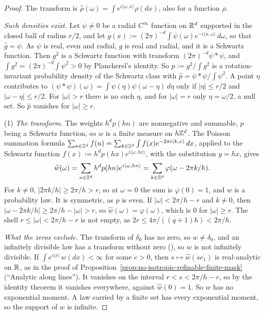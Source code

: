 \begin{proof}
The transform is $\widehat\rho(\omega) = \int e^{i\langle\omega, x\rangle}\rho(dx)$, also for a
function $\rho$.

\emph{Such densities exist.} Let $\psi \ne 0$ be a radial $C^\infty$ function on $\mathbb{R}^d$ supported
in the closed ball of radius $r/2$, and let
$g(x) := (2\pi)^{-d}\int\psi(\omega)e^{-i\langle x, \omega\rangle}\,d\omega$, so that
$\widehat g = \psi$. As $\psi$ is real, even and radial, $g$ is real and radial, and it is a
Schwartz function. Then $g^2$ is a Schwartz function with transform $(2\pi)^{-d}\psi * \psi$, and
$\int g^2 = (2\pi)^{-d}\int\psi^2 > 0$ by Plancherel's identity. So $p := g^2/\int g^2$ is a
rotation-invariant probability density of the Schwartz class with
$\widehat p = \psi * \psi/\int\psi^2$. A point $\eta$ contributes to
$(\psi * \psi)(\omega) = \int\psi(\eta)\psi(\omega - \eta)\,d\eta$ only if $|\eta| \le r/2$ and
$|\omega - \eta| \le r/2$. For $|\omega| > r$ there is no such $\eta$, and for $|\omega| = r$ only
$\eta = \omega/2$, a null set. So $\widehat p$ vanishes for $|\omega| \ge r$.

(1) \emph{The transform.} The weights $h^dp(hn)$ are nonnegative and summable, $p$ being a Schwartz
function, so $w$ is a finite measure on $h\mathbb{Z}^d$. The Poisson summation formula
$\sum_{n \in \mathbb{Z}^d}f(n) = \sum_{k \in \mathbb{Z}^d}\int f(x)e^{-2\pi i\langle k, x\rangle}\,dx$, applied to
the Schwartz function $f(x) := h^dp(hx)e^{i\langle\omega, hx\rangle}$, with the substitution
$y = hx$, gives
\[
  \widehat w(\omega) = \sum_{n \in \mathbb{Z}^d}h^dp(hn)e^{i\langle\omega, hn\rangle}
  = \sum_{k \in \mathbb{Z}^d}\varphi(\omega - 2\pi k/h) .
\]
For $k \ne 0$, $|2\pi k/h| \ge 2\pi/h > r$, so at $\omega = 0$ the sum is $\varphi(0) = 1$, and $w$
is a probability law. It is symmetric, as $p$ is even. If $|\omega| < 2\pi/h - r$ and $k \ne 0$,
then $|\omega - 2\pi k/h| \ge 2\pi/h - |\omega| > r$, so $\widehat w(\omega) = \varphi(\omega)$,
which is $0$ for $|\omega| \ge r$. The shell $r \le |\omega| < 2\pi/h - r$ is not empty, as
$2r \le 4\pi/((q+1)h) < 2\pi/h$.

\emph{What the zeros exclude.} The transform of $\delta_0$ has no zero, so $w \ne \delta_0$, and an
infinitely divisible law has a transform without zero (), so $w$ is not infinitely
divisible. If $\int e^{c|x|}\,w(dx) < \infty$ for some $c > 0$, then $s \mapsto \widehat w(se_1)$
is real-analytic on $\mathbb{R}$, as in the proof of
Proposition~\ref{prop:no-isotropic-refinable-finite-mask} (``Analytic along lines''). It vanishes on
the interval $r < s < 2\pi/h - r$, so by the identity theorem it vanishes everywhere, against
$\widehat w(0) = 1$. So $w$ has no exponential moment. A law carried by a finite set has every
exponential moment, so the support of $w$ is infinite.


\end{proof}
